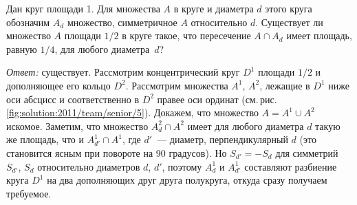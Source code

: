 \problem{}
Дан круг площади 1.
Для множества $A$ в круге и диаметра $d$ этого круга обозначим $A_d$ множество,
симметричное $A$ относительно $d$.
Существует ли множество $A$ площади $1 / 2$ в круге такое, что пересечение
$A \cap A_d$ имеет площадь, равную $1/4$, для любого диаметра~$d$?

%
\label{solution:2011/team/senior/5}%
\emph{Ответ:} существует.
Рассмотрим концентрический круг $D^1$ площади $1 / 2$ и дополняющее его кольцо
$D^2$.
Рассмотрим множества $A^1$, $A^2$, лежащие в $D^1$ ниже оси абсцисс и
соответственно в $D^2$ правее оси ординат
(см.\,рис.\,\ref{fig:solution:2011/team/senior/5}).
Докажем, что множество $A = A^1 \cup A^2$ искомое.
Заметим, что множество $A^2_d \cap A^2$ имеет для любого диаметра $d$ такую же
площадь, что и $A^1_{d'} \cap A^1$, где $d'$~--- диаметр, перпендикулярный $d$
(это становится ясным при повороте на 90 градусов).
Но $S_{d'} = -S_d$ для симметрий $S_{d'}$, $S_d$ относительно диаметров $d$,
$d'$, поэтому $A^1_d$ и $A^1_{d'}$ составляют разбиение круга $D^1$ на два
дополняющих друг друга полукруга, откуда сразу получаем требуемое.

\endproblem
